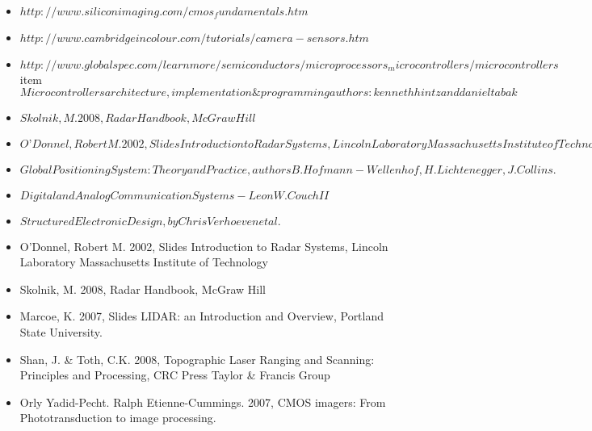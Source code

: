 \documentclass{article}
\begin{document}
\begin{itemize}
\item
$http://www.siliconimaging.com/cmos_fundamentals.htm$
\item
$http://www.cambridgeincolour.com/tutorials/camera-sensors.htm$
\item
$http://www.globalspec.com/learnmore/semiconductors/microprocessors_microcontrollers/microcontrollers$
item
$Microcontrollers architecture, implementation \& programming 
authors : kenneth hintz and daniel tabak$
\item
$ Skolnik, M. 2008, Radar Handbook, McGraw Hill$
\item
$ O’Donnel, Robert M. 2002, Slides Introduction to Radar Systems, Lincoln Laboratory Massachusetts Institute of Technology$
\item
$Global Positioning System: Theory and Practice ,authors  B. Hofmann-Wellenhof,H. Lichtenegger,J. Collins.$
\item
$Digital and Analog Communication Systems - Leon W. Couch II$
\item
$Structured Electronic Design, by Chris Verhoeven et al.$
\item
O’Donnel, Robert M. 2002, Slides Introduction to Radar Systems, Lincoln Laboratory Massachusetts Institute of Technology
\item
Skolnik, M. 2008, Radar Handbook, McGraw Hill
\item
Marcoe, K. 2007, Slides LIDAR: an Introduction and Overview, Portland State University.
\item
Shan, J. \& Toth, C.K. 2008, Topographic Laser Ranging and Scanning: Principles and Processing, CRC Press Taylor \& Francis Group
\item
Orly Yadid-Pecht. Ralph Etienne-Cummings. 2007, CMOS imagers: From Phototransduction to image processing.
\end{itemize}
\end{document}
